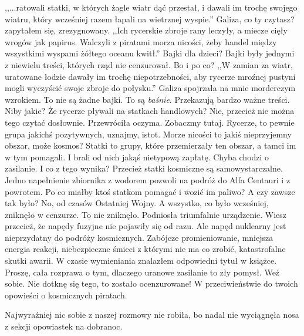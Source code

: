 \begin{dialogue}
	\ds{} ,,...ratowali statki, w których żagle wiatr dąć przestał, i dawali im trochę swojego wiatru, który wcześniej razem łapali na wietrznej wyspie.''
	\ds{} Galiza, co ty czytasz? \dm{} zapytałem się, zrezygnowany.
	\ds{} ,,Ich rycerskie zbroje rany leczyły, a miecze cięły wrogów jak papirus. Walczyli z piratami morza nicości, żeby handel między wszystkimi wyspami żółtego oceanu kwitł.''
	\ds{} Bajki dla dzieci? \dm{} Bajki były jednymi z niewielu treści, których rząd nie cenzurował. Bo i po co?
	\ds{} ,,W zamian za wiatr, uratowane łodzie dawały im trochę niepotrzebności, aby rycerze mroźnej pustyni mogli wyczyścić swoje zbroje do połysku.'' 			\dm{} Galiza spojrzała na mnie morderczym wzrokiem. \dm{} To nie są żadne bajki. To są \emph{baśnie}. Przekazują bardzo ważne treści.
	\ds{} Niby jakie? Że rycerze pływali na statkach handlowych?
	\ds{} Nie, przecież nie można tego czytać dosłownie. \dm{} Przewróciła oczyma. \dm{} Zobaczmy tutaj. Rycerze, to pewnie grupa jakichś pozytywnych, uznajmy, istot. Morze nicości to jakiś nieprzyjemny obszar, może kosmos? Statki to grupy, które przemierzały ten obszar, a tamci im w tym pomagali. I brali od nich jakąś nietypową zapłatę. Chyba chodzi o zasilanie.
	\ds{} I co z tego wynika? Przecież statki kosmiczne są samowystarczalne. Jedno napełnienie zbiornika z wodorem pozwoli na podróż do Alfa Centauri i z powrotem. Po co miałby ktoś statkom pomagać i wozić im paliwo?
	\ds{} A czy zawsze tak było?
	\ds{} No, od czasów Ostatniej Wojny. A wszystko, co było wcześniej, zniknęło w cenzurze.
	\ds{} To nie zniknęło. \dm{} Podniosła triumfalnie urządzenie. \dm{} Wiesz przecież, że napędy fuzyjne nie pojawiły się od razu.
	\ds{} Ale napęd nuklearny jest nieprzydatny do podróży kosmicznych. Zabójcze promieniowanie, mniejsza energia reakcji, niebezpieczne śmieci z którymi nie ma co zrobić, katastrofalne skutki awarii. \dm{} W czasie wymieniania znalazłem odpowiedni tytuł w książce. \dm{} Proszę, cała rozprawa o tym, dlaczego uranowe zasilanie to zły pomysł. Weź sobie.
	\ds{} Nie dotknę się tego, to zostało ocenzurowane!
	\ds{} W przeciwieństwie do twoich opowieści o kosmicznych piratach.
\end{dialogue}

Najwyraźniej nic sobie z naszej rozmowy nie robiła, bo nadal nie wyciągnęła nosa z sekcji opowiastek na dobranoc.


















